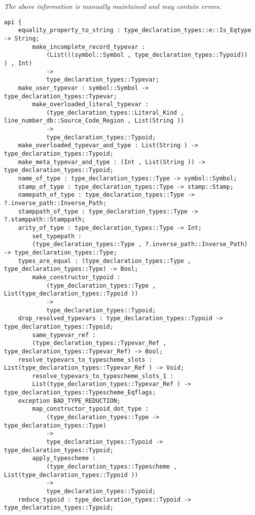 \label{api:Type\_Junk}

{\tiny \it The above information is manually maintained and may contain errors.}
\begin{verbatim}
api {
    equality_property_to_string : type_declaration_types::e::Is_Eqtype -> String;
        make_incomplete_record_typevar :
            (List(((symbol::Symbol , type_declaration_types::Typoid)) ) , Int)
            ->
            type_declaration_types::Typevar;
    make_user_typevar : symbol::Symbol -> type_declaration_types::Typevar;
        make_overloaded_literal_typevar :
            (type_declaration_types::Literal_Kind , line_number_db::Source_Code_Region , List(String ))
            ->
            type_declaration_types::Typoid;
    make_overloaded_typevar_and_type : List(String ) -> type_declaration_types::Typoid;
    make_meta_typevar_and_type : (Int , List(String )) -> type_declaration_types::Typoid;
    name_of_type : type_declaration_types::Type -> symbol::Symbol;
    stamp_of_type : type_declaration_types::Type -> stamp::Stamp;
    namepath_of_type : type_declaration_types::Type -> ?.inverse_path::Inverse_Path;
    stamppath_of_type : type_declaration_types::Type -> ?.stamppath::Stamppath;
    arity_of_type : type_declaration_types::Type -> Int;
        set_typepath :
        (type_declaration_types::Type , ?.inverse_path::Inverse_Path) -> type_declaration_types::Type;
    types_are_equal : (type_declaration_types::Type , type_declaration_types::Type) -> Bool;
        make_constructor_typoid :
            (type_declaration_types::Type , List(type_declaration_types::Typoid ))
            ->
            type_declaration_types::Typoid;
    drop_resolved_typevars : type_declaration_types::Typoid -> type_declaration_types::Typoid;
        same_typevar_ref :
        (type_declaration_types::Typevar_Ref , type_declaration_types::Typevar_Ref) -> Bool;
    resolve_typevars_to_typescheme_slots : List(type_declaration_types::Typevar_Ref ) -> Void;
        resolve_typevars_to_typescheme_slots_1 :
        List(type_declaration_types::Typevar_Ref ) -> type_declaration_types::Typescheme_Eqflags;
    exception BAD_TYPE_REDUCTION;
        map_constructor_typoid_dot_type :
            (type_declaration_types::Type -> type_declaration_types::Type)
            ->
            type_declaration_types::Typoid -> type_declaration_types::Typoid;
        apply_typescheme :
            (type_declaration_types::Typescheme , List(type_declaration_types::Typoid ))
            ->
            type_declaration_types::Typoid;
    reduce_typoid : type_declaration_types::Typoid -> type_declaration_types::Typoid;

\end{verbatim}
